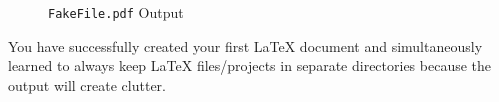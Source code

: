\begin{figure}
  \caption{\texttt{FakeFile.pdf} Output} \label{fig:output}
  \begin{center}


  \end{center}
\end{figure}


You have successfully created your first \LaTeX{} document and
simultaneously learned to always keep \LaTeX{} files/projects in
separate directories because the output will create clutter.


